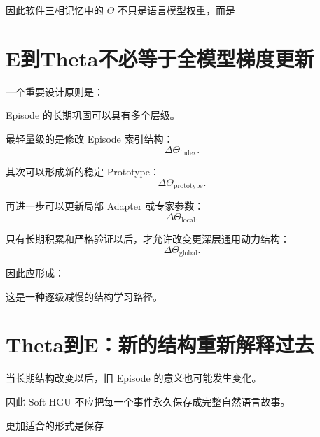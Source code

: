 因此软件三相记忆中的 $\Theta$ 不只是语言模型权重，而是
\begin{statementbox}
\centering
{}
\end{statementbox}

\section{E到Theta不必等于全模型梯度更新}

一个重要设计原则是：
\begin{statementbox}
\centering
{}
\end{statementbox}

Episode 的长期巩固可以具有多个层级。

最轻量级的是修改 Episode 索引结构：
\[
\Delta\Theta_{\mathrm{index}}.
\]

其次可以形成新的稳定 Prototype：
\[
\Delta\Theta_{\mathrm{prototype}}.
\]

再进一步可以更新局部 Adapter 或专家参数：
\[
\Delta\Theta_{\mathrm{local}}.
\]

只有长期积累和严格验证以后，才允许改变更深层通用动力结构：
\[
\Delta\Theta_{\mathrm{global}}.
\]

因此应形成：
\begin{statementbox}
\centering
{}
\end{statementbox}

这是一种逐级减慢的结构学习路径。

\section{Theta到E：新的结构重新解释过去}

当长期结构改变以后，旧 Episode 的意义也可能发生变化。

因此 Soft-HGU 不应把每一个事件永久保存成完整自然语言故事。

更加适合的形式是保存
\begin{statementbox}
\centering
{}
\end{statementbox}

